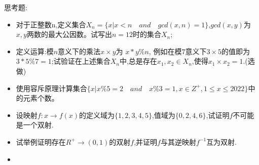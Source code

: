 \documentclass[UTF8]{article}
\begin{document}
思考题:

\begin{itemize}
    \item 对于正整数n,定义集合$X_n = \{ x | x < n \quad and \quad gcd(x, n) = 1\}$,$gcd(x, y)$为$x, y$两数的最大公因数。试写出$n = 12$时的集合$X_n$;

    \item 定义运算:模$n$意义下的乘法$x \times y$为 $x * y \% n$, 例如在模$7$意义下$3 \times 5$的值即为$3 * 5 \% 7 = 1$;试验证在上述集合$X_n$中,总是存在$x_1, x_2 \in X_n$,使得$x_1\times x_2 = 1$.(选做)

    \item 使用容斥原理计算集合$\{x | x \% 5 = 2 \quad and \quad x \% 3 = 1, x \in Z^{+}, 1 \leq x \leq 2022\}$中的元素个数。

    \item 设映射$f:x\to f(x)$的定义域为$\{ 1, 2, 3, 4, 5 \}$,值域为$\{ 0, 2, 4, 6 \}$,试证明$f$不可能是一个双射.

    \item 试举例证明存在$R^{+} \to (0, 1)$的双射$f$,并证明$f$与其逆映射$f^{-1}$互为双射.

    \item 
\end{itemize}
\end{document}
